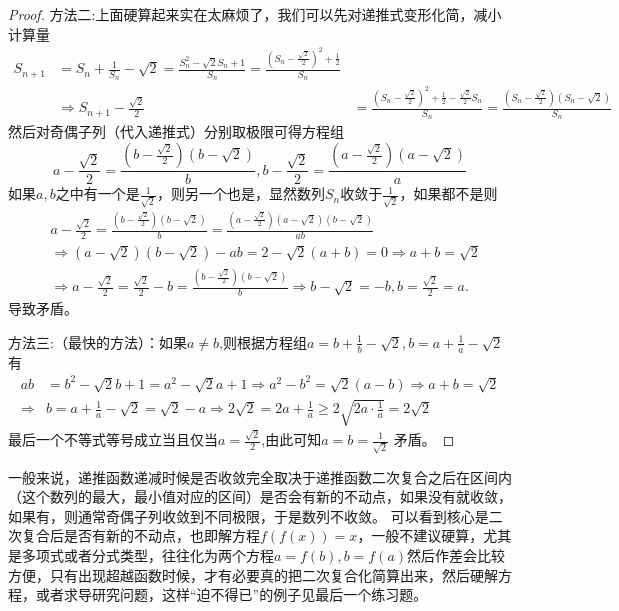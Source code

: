 \documentclass[../../main.tex]{subfiles}
\begin{document}
\begin{proof}
{\color{blue}方法二:}上面硬算起来实在太麻烦了，我们可以先对递推式变形化简，减小计算量
\begin{align*}
S_{n + 1}&=S_n+\frac{1}{S_n}-\sqrt{2}=\frac{S_n^2-\sqrt{2}S_n + 1}{S_n}=\frac{\left(S_n-\frac{\sqrt{2}}{2}\right)^2+\frac{1}{2}}{S_n}\\
&\Rightarrow S_{n + 1}-\frac{\sqrt{2}}{2}&=\frac{\left(S_n-\frac{\sqrt{2}}{2}\right)^2+\frac{1}{2}-\frac{\sqrt{2}}{2}S_n}{S_n}=\frac{\left(S_n-\frac{\sqrt{2}}{2}\right)(S_n-\sqrt{2})}{S_n}
\end{align*}
然后对奇偶子列（代入递推式）分别取极限可得方程组
\[a-\frac{\sqrt{2}}{2}=\frac{\left(b-\frac{\sqrt{2}}{2}\right)(b - \sqrt{2})}{b},b-\frac{\sqrt{2}}{2}=\frac{\left(a-\frac{\sqrt{2}}{2}\right)(a - \sqrt{2})}{a}\]
如果\(a,b\)之中有一个是\(\frac{1}{\sqrt{2}}\)，则另一个也是，显然数列\(S_n\)收敛于\(\frac{1}{\sqrt{2}}\)，如果都不是则
\begin{align*}
&a-\frac{\sqrt{2}}{2}=\frac{\left( b-\frac{\sqrt{2}}{2} \right) (b-\sqrt{2})}{b}=\frac{\left( a-\frac{\sqrt{2}}{2} \right) (a-\sqrt{2})(b-\sqrt{2})}{ab}
\\
&\Rightarrow \left( a-\sqrt{2} \right) \left( b-\sqrt{2} \right) -ab=2-\sqrt{2}(a+b)=0\Rightarrow a+b=\sqrt{2}
\\
&\Rightarrow a-\frac{\sqrt{2}}{2}=\frac{\sqrt{2}}{2}-b=\frac{\left( b-\frac{\sqrt{2}}{2} \right) (b-\sqrt{2})}{b}\Rightarrow b-\sqrt{2}=-b,b=\frac{\sqrt{2}}{2}=a.
\end{align*}
导致矛盾。

{\color{blue}方法三:}（最快的方法）：如果\(a\neq b\),则根据方程组\(a = b+\frac{1}{b}-\sqrt{2},b = a+\frac{1}{a}-\sqrt{2}\)有
\begin{align*}
ab&=b^2-\sqrt{2}b+1=a^2-\sqrt{2}a+1\Rightarrow a^2-b^2=\sqrt{2}\left( a-b \right) \Rightarrow a+b=\sqrt{2}\\
\Rightarrow &b=a+\frac{1}{a}-\sqrt{2}=\sqrt{2}-a\Rightarrow 2\sqrt{2}=2a+\frac{1}{a}\geqslant 2\sqrt{2a\cdot\frac{1}{a}}=2\sqrt{2}
\end{align*}
最后一个不等式等号成立当且仅当$a=\frac{\sqrt{2}}{2}$,由此可知\(a = b=\frac{1}{\sqrt{2}}\) 矛盾。
\end{proof}
\begin{remark}
一般来说，递推函数递减时候是否收敛完全取决于递推函数二次复合之后在区间内（这个数列的最大，最小值对应的区间）是否会有新的不动点，如果没有就收敛，如果有，则通常奇偶子列收敛到不同极限，于是数列不收敛。
可以看到核心是二次复合后是否有新的不动点，也即解方程\(f(f(x)) = x\)，一般不建议硬算，尤其是多项式或者分式类型，往往化为两个方程\(a = f(b),b = f(a)\)然后作差会比较方便，只有出现超越函数时候，才有必要真的把二次复合化简算出来，然后硬解方程，或者求导研究问题，这样“迫不得已”的例子见最后一个练习题。
\end{remark}
\end{document}
